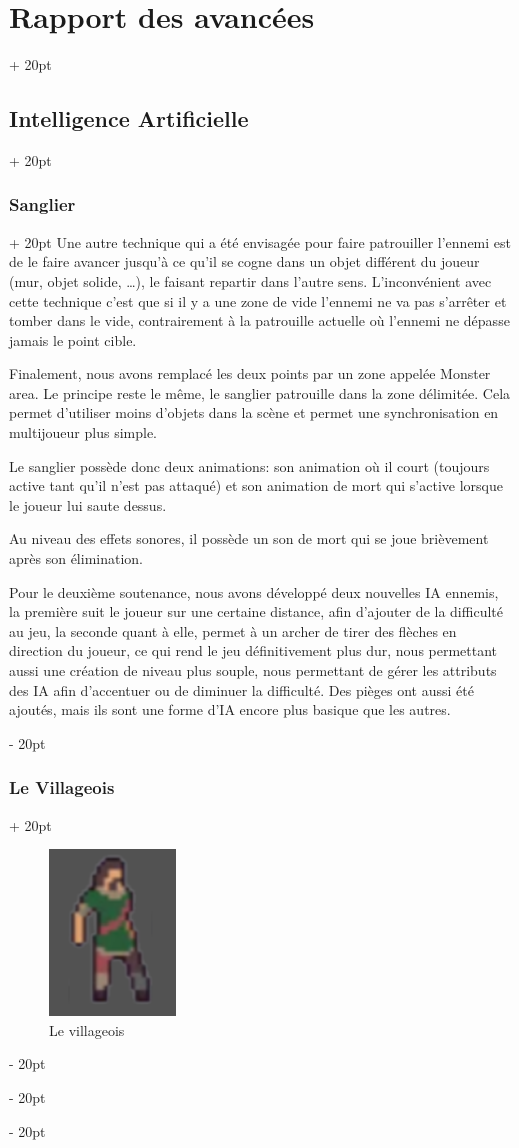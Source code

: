 \documentclass[a4paper, 12pt, twoside]{article}
\newcommand{\ind}[1][20pt]{\advance\leftskip + #1}
\newcommand{\deind}[1][20pt]{\advance\leftskip - #1}
\newenvironment{indt}[2][20pt]{#2 \par \ind[#1]}{\par \deind} %
\begin{document}
\begin{indt}{\section{Rapport des avancées}}
\begin{indt}{\subsection{Intelligence Artificielle}}
\begin{indt}{\subsubsection{Sanglier}}
                Une autre technique qui a été envisagée pour faire patrouiller l’ennemi est de le faire avancer jusqu'à ce qu’il se cogne dans un objet différent du joueur (mur, objet solide, …), le faisant repartir dans l’autre sens. L’inconvénient avec cette technique c’est que si il y a une zone de vide l’ennemi ne va pas s’arrêter et tomber dans le vide, contrairement à la patrouille actuelle où l’ennemi ne dépasse jamais le point cible.

                Finalement, nous avons remplacé les deux points par un zone appelée Monster area. Le principe reste le même, le sanglier patrouille dans la zone délimitée. Cela permet d’utiliser moins d’objets dans la scène et permet une synchronisation en multijoueur plus simple.

                Le sanglier possède donc deux animations: son animation où il court (toujours active tant qu’il n’est pas attaqué) et son animation de mort qui s’active lorsque le joueur lui saute dessus.

                Au niveau des effets sonores, il possède un son de mort qui se joue brièvement après son élimination.

                Pour le deuxième soutenance, nous avons développé deux nouvelles IA ennemis, la première suit le joueur sur une certaine distance, afin d’ajouter de la difficulté au jeu, la seconde quant à elle, permet à un archer de tirer des flèches en direction du joueur, ce qui rend le jeu définitivement plus dur, nous permettant aussi une création de niveau plus souple, nous permettant de gérer les attributs des IA afin d’accentuer ou de diminuer la difficulté. Des pièges ont aussi été ajoutés, mais ils sont une forme d’IA encore plus basique que les autres.
            \end{indt}

            \begin{indt}{\subsubsection{Le Villageois}}
                \begin{figure}[h]
                    \centering
                    \includegraphics[width=0.3\textwidth]{villageois.png}
                    \caption{Le villageois}
                    \label{fig:mesh1}
                \end{figure}


\end{indt}
\end{indt}
\end{indt}
\end{document}
